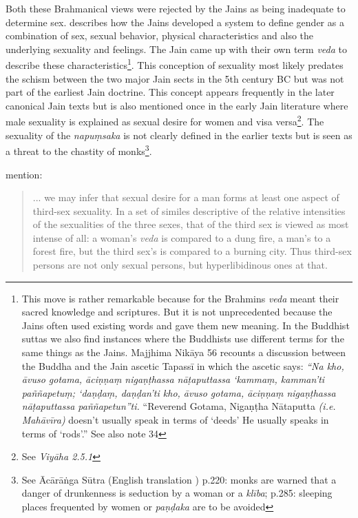 Both these Brahmanical views were rejected by the Jains as being inadequate to determine sex. \cite{dundas} describes how the Jains developed a system to define gender as a combination of sex, sexual behavior, physical characteristics and also the underlying sexuality and feelings. The Jain came up with their own term {\em veda} to describe these characteristics\footnote{This move is rather remarkable because for the Brahmins {\em veda} meant their sacred knowledge and scriptures. But it is not unprecedented because the Jains often used existing words and gave them new meaning. In the Buddhist suttas we also find instances where the Buddhists use different terms for the same things as the Jains. Majjhima Nikāya 56 recounts a discussion between the Buddha and the Jain ascetic Tapassī in which the ascetic says: {\em “Na kho, āvuso gotama, āciṇṇaṃ nigaṇṭhassa nāṭaputtassa ‘kammaṃ, kamman’ti paññapetuṃ; ‘daṇḍaṃ, daṇḍan’ti kho, āvuso gotama, āciṇṇaṃ nigaṇṭhassa nāṭaputtassa paññapetun”ti.} “Reverend Gotama, Nigaṇṭha Nātaputta {\em (i.e. Mahāvīra)} doesn’t usually speak in terms of ‘deeds’ He usually speaks in terms of ‘rods’.” See also \cite{zwilling} note 34}. This conception of sexuality most likely predates the schism between the two major Jain sects in the 5th century BC but was not part of the earliest Jain doctrine. This concept appears frequently in the later canonical Jain texts but is also mentioned once in the early Jain literature where male sexuality is explained as sexual desire for women and visa versa\footnote{See {\em Viyāha 2.5.1}}. The sexuality of the {\em napuṃsaka} is not clearly defined in the earlier texts but is seen as a threat to the chastity of monks\footnote{See Ācārāṅga Sūtra (English translation \cite{jacobi}) p.220: monks are warned that a danger of drunkenness is seduction by a woman or a {\em klība}; p.285: sleeping places frequented by women or {\em paṇḍaka} are to be avoided}.

\cite{zwilling} mention:

\begin{quote}
... we may infer that sexual desire for a man forms at least one aspect of third-sex sexuality. In a set of similes descriptive of the relative intensities of the sexualities of the three sexes, that of the third sex is viewed as most intense of all: a woman's {\em veda} is compared to a dung fire, a man's to a forest fire, but the third sex's is compared to a burning city. Thus third-sex persons are not only sexual persons, but hyperlibidinous ones at that.
\end{quote}

